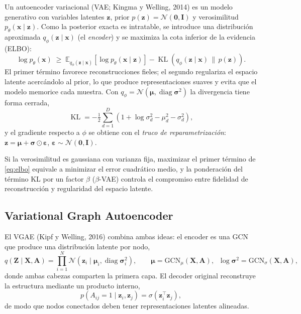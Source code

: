 \documentclass[11pt,a4paper]{article}
\newcommand{\A}{\mathbf{A}}
\newcommand{\X}{\mathbf{X}}
\newcommand{\Z}{\mathbf{Z}}
\newcommand{\E}{\mathbb{E}}
\DeclareMathOperator{\KL}{KL}
\DeclareMathOperator{\diag}{diag}
\begin{document}
Un autoencoder variacional (VAE; Kingma y Welling, 2014) es un modelo generativo con
variables latentes $\mathbf{z}$, prior $p(\mathbf{z})=\mathcal{N}(\mathbf{0},\mathbf{I})$
y verosimilitud $p_\theta(\mathbf{x}\mid\mathbf{z})$. Como la posterior exacta es
intratable, se introduce una distribución aproximada $q_\phi(\mathbf{z}\mid\mathbf{x})$
(el \emph{encoder}) y se maximiza la cota inferior de la evidencia (ELBO):
\begin{equation}
\log p_\theta(\mathbf{x}) \;\ge\;
\E_{q_\phi(\mathbf{z}\mid\mathbf{x})}\!\left[\log p_\theta(\mathbf{x}\mid\mathbf{z})\right]
-\KL\!\left(q_\phi(\mathbf{z}\mid\mathbf{x})\,\big\|\,p(\mathbf{z})\right).
\label{eq:elbo}
\end{equation}
El primer término favorece reconstrucciones fieles; el segundo regulariza el espacio
latente acercándolo al prior, lo que produce representaciones suaves y evita que el
modelo memorice cada muestra. Con $q_\phi=\mathcal{N}(\bm\mu,\diag\bm\sigma^2)$ la
divergencia tiene forma cerrada,
\begin{equation}
\KL = -\tfrac12\sum_{d=1}^{D}\left(1+\log\sigma_d^2-\mu_d^2-\sigma_d^2\right),
\end{equation}
y el gradiente respecto a $\phi$ se obtiene con el \emph{truco de
reparametrización}: $\mathbf{z}=\bm\mu+\bm\sigma\odot\bm\varepsilon$,
$\bm\varepsilon\sim\mathcal{N}(\mathbf{0},\mathbf{I})$.

Si la verosimilitud es gaussiana con varianza fija, maximizar el primer término de
\eqref{eq:elbo} equivale a minimizar el error cuadrático medio, y la ponderación del
término KL por un factor $\beta$ ($\beta$-VAE) controla el compromiso entre fidelidad
de reconstrucción y regularidad del espacio latente.

\subsection{Variational Graph Autoencoder}

El VGAE (Kipf y Welling, 2016) combina ambas ideas: el encoder es una GCN que produce
una distribución latente por nodo,
\begin{equation}
q(\Z\mid\X,\A)=\prod_{i=1}^{N}\mathcal{N}\!\left(\mathbf{z}_i\mid\bm\mu_i,\diag\bm\sigma_i^2\right),
\qquad
\bm\mu=\mathrm{GCN}_\mu(\X,\A),\;\;\log\bm\sigma^2=\mathrm{GCN}_\sigma(\X,\A),
\end{equation}
donde ambas cabezas comparten la primera capa. El decoder original reconstruye la
estructura mediante un producto interno,
\begin{equation}
p(A_{ij}=1\mid\mathbf{z}_i,\mathbf{z}_j)=\sigma\!\left(\mathbf{z}_i^\top\mathbf{z}_j\right),
\end{equation}
de modo que nodos conectados deben tener representaciones latentes alineadas.
\end{document}
